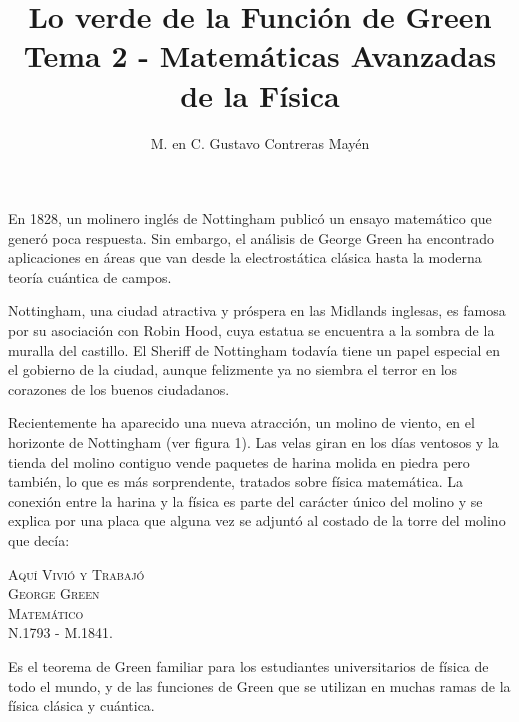 
\title{Lo verde de la Función de Green \\ \large {Tema 2 - Matemáticas Avanzadas de la Física}\vspace{-3ex}}

\author{M. en C. Gustavo Contreras Mayén}
\date{ }

\pagestyle{fancy}
\fancyhf{}
\lhead{\leftmark}
\rfoot{\thepage}
\setlength{\headheight}{16pt}%



\maketitle
\fontsize{14}{14}\selectfont

En 1828, un molinero inglés de Nottingham publicó un ensayo matemático que generó poca respuesta. Sin embargo, el análisis de George Green ha encontrado aplicaciones en áreas que van desde la electrostática clásica hasta la moderna teoría cuántica de campos.
\par
Nottingham, una ciudad atractiva y próspera en las Midlands inglesas, es famosa por su asociación con Robin Hood, cuya estatua se encuentra a la sombra de la muralla del castillo. El Sheriff de Nottingham todavía tiene un papel especial en el gobierno de la ciudad, aunque felizmente ya no siembra el terror en los corazones de los buenos ciudadanos.
\par
Recientemente ha aparecido una nueva atracción, un molino de viento, en el horizonte de Nottingham (ver figura 1). Las velas giran en los días ventosos y la tienda del molino contiguo vende paquetes de harina molida en piedra pero también, lo que es más sorprendente, tratados sobre física matemática. La conexión entre la harina y la física es parte del carácter único del molino y se explica por una placa que alguna vez se adjuntó al costado de la torre del molino que decía:
\par
\begin{center}
\textsc{Aquí Vivió y Trabajó \\
George Green \\
Matemático \\
N.1793 - M.1841.}
\end{center}

Es el teorema de Green familiar para los estudiantes universitarios de física de todo el mundo, y de las funciones de Green que se utilizan en muchas ramas de la física clásica y cuántica.

